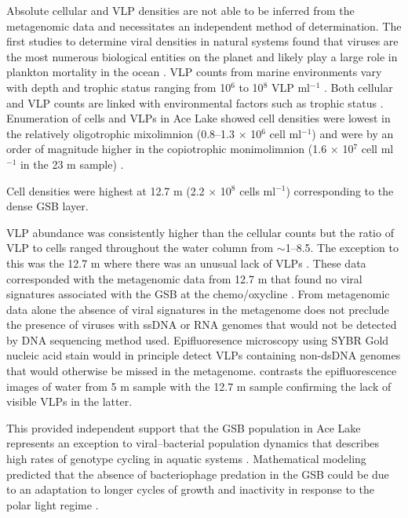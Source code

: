 Absolute cellular and \ac{VLP} densities are not able to be inferred from the metagenomic data and necessitates an independent method of determination.
The first studies to determine viral densities in natural systems found that viruses are the most numerous biological entities on the planet and likely play a large role in plankton mortality in the ocean \cite{Bergh1989,Proctor1990}. 
\ac{VLP} counts from marine environments vary with depth and trophic status ranging from 10$^6$ to 10$^8$ \acs{VLP} ml$^{-1}$ \cite{Suttle2005}.
Both cellular and \ac{VLP} counts are linked with environmental factors such as trophic status \cite{Lauro2009}. 
Enumeration of cells and \acp{VLP} in Ace Lake showed cell densities were lowest in the relatively oligotrophic mixolimnion (0.8--1.3 $\times$ 10$^6$ cell ml$^{-1}$) and were by an order of magnitude higher in the copiotrophic monimolimnion (1.6 $\times$ 10$^7$ cell ml$^{-1}$ in the 23 m sample) .

Cell densities were highest at 12.7 m (2.2 $\times$ 10$^8$ cells ml$^{-1}$) corresponding to the dense \ac{GSB} layer.


\ac{VLP} abundance was consistently higher than the cellular counts but the ratio of \ac{VLP} to cells ranged throughout the water column from $\sim$1--8.5.
The exception to this was the 12.7 m where there was an unusual lack of \acp{VLP} .
These data corresponded with the metagenomic data from 12.7 m that found no viral signatures associated with the \ac{GSB} at the chemo/oxycline \cite{Lauro2011}.
From metagenomic data alone the absence of viral signatures in the metagenome does not preclude the presence of viruses with ss\textsc{DNA} or \textsc{RNA} genomes that would not be detected by \textsc{DNA} sequencing method used.
Epifluoresence microscopy using SYBR Gold nucleic acid stain would in principle detect \acp{VLP} containing non-dsDNA genomes \cite{Patel2007} that would otherwise be missed in the metagenome.
 contrasts the epifluorescence images of water from 5 m sample with the 12.7 m sample confirming the lack of visible \acp{VLP} in the latter.

This provided independent support that the \ac{GSB} population in Ace Lake represents an exception to viral--bacterial population dynamics that describes high rates of genotype cycling in aquatic systems \cite{Rodriguez-Brito2010}.
Mathematical modeling predicted that the absence of bacteriophage predation in the \ac{GSB} could be due to an adaptation to longer cycles of growth and inactivity in response to the polar light regime \cite{Lauro2011}. 


